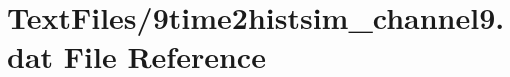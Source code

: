 \hypertarget{9time2histsim__channel9_8dat}{}\section{Text\+Files/9time2histsim\+\_\+channel9.dat File Reference}
\label{9time2histsim__channel9_8dat}
